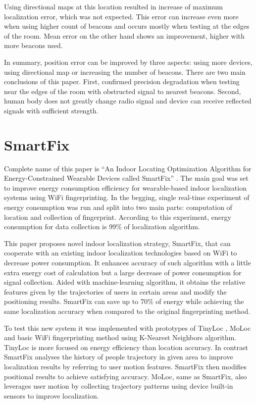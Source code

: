 Using directional maps at this location resulted in increase of maximum localization error, which was not expected. This error can increase even more when using higher count of beacons and occurs mostly when testing at the edges of the room. Mean error on the other hand shows an improvement, higher with more beacons used. 

In summary, position error can be improved by three aspects: using more devices, using directional map or increasing the number of beacons. There are two main conclusions of this paper. First, confirmed precision degradation when testing near the edges of the room with obstructed signal to nearest beacons. Second, human body does not greatly change radio signal and device can receive reflected signals with sufficient strength. 

\section{SmartFix}\label{sec:SmartFix}
Complete name of this paper is \enquote{An Indoor Locating Optimization Algorithm for Energy-Constrained Wearable Devices called SmartFix} \cite{SmartFix}. The main goal was set to improve energy consumption efficiency for wearable-based indoor localization systems using WiFi fingerprinting. In the begging, single real-time experiment of energy consumption was run and split into two main parts: computation of location and collection of fingerprint. According to this experiment, energy consumption for data collection is 99\% of localization algorithm.

This paper proposes novel indoor localization strategy, SmartFix, that can cooperate with an existing indoor localization technologies based on WiFi to decrease power consumption. It enhances accuracy of such algorithm with a little extra energy cost of calculation but a large decrease of power consumption for signal collection. Aided with machine-learning algorithm, it obtains the relative features given by the trajectories of users in certain areas and modify the positioning results. SmartFix can save up to 70\% of energy while achieving the same localization accuracy when compared to the original fingerprinting method.

To test this new system it was implemented with prototypes of TinyLoc \cite{TinyLoc}, MoLoc \cite{MoLoc} and basic WiFi fingerprinting method using K-Nearest Neighbors algorithm. TinyLoc is more focused on energy efficiency than location accuracy. In contrast SmartFix analyses the history of people trajectory in given area to improve localization results by referring to user motion features. SmartFix then modifies positional results to achieve satisfying accuracy. MoLoc, same as SmartFix, also leverages user motion by collecting trajectory patterns using device built-in sensors to improve localization.

